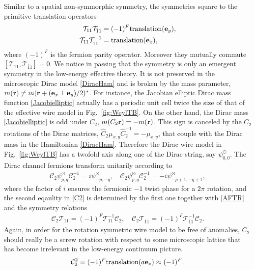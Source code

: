 Similar to a spatial non-symmorphic symmetry, the \AFTR symmetries square to the primitive translation operators \begin{align}\mathcal{T}_{11}\mathcal{T}_{\bar{1}1}&=(-1)^F\mbox{translation}({\bf e}_y),\nonumber\\\mathcal{T}_{11}\mathcal{T}_{\bar{1}1}^{-1}&=\mbox{translation}({\bf e}_x),\label{AFTRalg}\end{align} where $(-1)^F$ is the fermion parity operator. Moreover they mutually commute $[\mathcal{T}_{11},\mathcal{T}_{\bar{1}1}]=0$. We notice in passing that the \AFTR symmetry is only an emergent symmetry in the low-energy effective theory. It is not preserved in the microscopic Dirac model \eqref{DiracHam} and is broken by the mass parameter, $m({\bf r})\neq m({\bf r}+({\bf e}_x\pm{\bf e}_y)/2)^\ast$. For instance, the Jacobian elliptic Dirac mass function \eqref{Jacobielliptic} actually has a periodic unit cell twice the size of that of the effective wire model in Fig.~\ref{fig:WeylTB}. On the other hand, the Dirac mass \eqref{Jacobielliptic} is odd under $C_2$, $m(C_2{\bf r})=-m({\bf r})$. This sign is canceled by the $C_2$ rotations of the Dirac matrices, $\hat{C}_2\mu_{x,y}\hat{C}_2^{-1}=-\mu_{x,y}$, that couple with the Dirac mass in the Hamiltonian \eqref{DiracHam}. Therefore the Dirac wire model in Fig.~\ref{fig:WeylTB} has a twofold axis along one of the Dirac string, say $\psi^\odot_{0,0}$. The Dirac channel fermions transform unitarily according to \begin{align}\mathcal{C}_2\psi^\odot_{p,q}\mathcal{C}_2^{-1}=i\psi^\odot_{-p,-q},\quad\mathcal{C}_2\psi^\otimes_{p,q}\mathcal{C}_2^{-1}=-i\psi^\otimes_{-p+1,-q+1},\label{C2}\end{align} where the factor of $i$ ensures the fermionic $-1$ twist phase for a $2\pi$ rotation, and the second eqaulity in \eqref{C2} is determined by the first one together with \eqref{AFTR} and the symmetry relations \begin{gather}\mathcal{C}_2\mathcal{T}_{11}=(-1)^F\mathcal{T}_{11}^{-1}\mathcal{C}_2,\quad\mathcal{C}_2\mathcal{T}_{\bar{1}1}=(-1)^F\mathcal{T}_{\bar{1}1}^{-1}\mathcal{C}_2.\label{C2Trelation}\end{gather} Again, in order for the rotation symmetric wire model to be free of anomalies, $C_2$ should really be a screw rotation with respect to some microscopic lattice that has become irrelevant in the low-energy continuum picture. \begin{align}\mathcal{C}_2^2=(-1)^F\mathrm{translation}(a{\bf e}_z)\approx(-1)^F.\label{C2square}\end{align}

